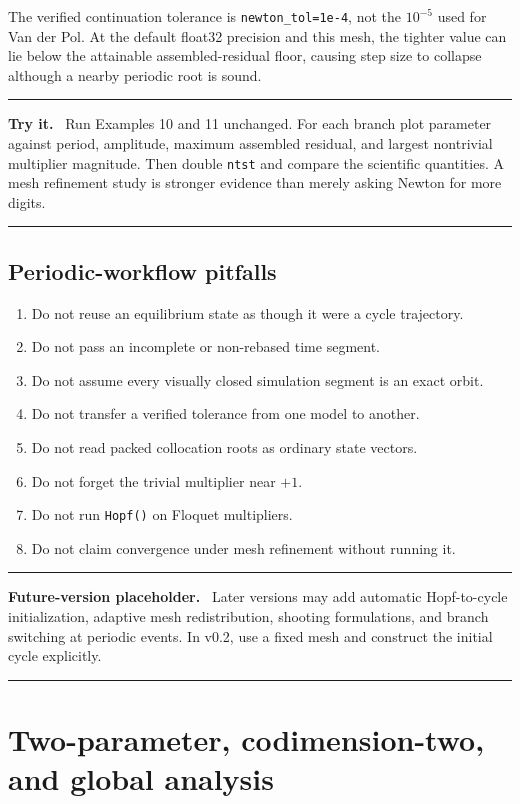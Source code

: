 \documentclass[11pt,oneside]{book}
\newenvironment{trythis}
  {\par\medskip\noindent\begin{minipage}{\textwidth}
   \color{JaxTeal}\rule{\textwidth}{0.8pt}\par
   \textbf{Try it.}\ \color{black}}
  {\par\color{JaxTeal}\rule{\textwidth}{0.8pt}
   \end{minipage}\par\medskip}
\newenvironment{futurebox}
  {\par\medskip\noindent\begin{minipage}{\textwidth}
   \color{black!55}\rule{\textwidth}{0.8pt}\par
   \textbf{Future-version placeholder.}\ \color{black}}
  {\par\color{black!55}\rule{\textwidth}{0.8pt}
   \end{minipage}\par\medskip}
\begin{document}
The verified continuation tolerance is \texttt{newton\_tol=1e-4}, not the
$10^{-5}$ used for Van der Pol. At the default float32 precision and this mesh,
the tighter value can lie below the attainable assembled-residual floor,
causing step size to collapse although a nearby periodic root is sound.

\begin{trythis}
Run Examples 10 and 11 unchanged. For each branch plot parameter against
period, amplitude, maximum assembled residual, and largest nontrivial
multiplier magnitude. Then double \texttt{ntst} and compare the scientific
quantities. A mesh refinement study is stronger evidence than merely asking
Newton for more digits.
\end{trythis}

\section{Periodic-workflow pitfalls}

\begin{enumerate}
  \item Do not reuse an equilibrium state as though it were a cycle trajectory.
  \item Do not pass an incomplete or non-rebased time segment.
  \item Do not assume every visually closed simulation segment is an exact orbit.
  \item Do not transfer a verified tolerance from one model to another.
  \item Do not read packed collocation roots as ordinary state vectors.
  \item Do not forget the trivial multiplier near $+1$.
  \item Do not run \texttt{Hopf()} on Floquet multipliers.
  \item Do not claim convergence under mesh refinement without running it.
\end{enumerate}

\begin{futurebox}
Later versions may add automatic Hopf-to-cycle initialization, adaptive mesh
redistribution, shooting formulations, and branch switching at periodic
events. In v0.2, use a fixed mesh and construct the initial cycle explicitly.
\end{futurebox}

\chapter{Two-parameter, codimension-two, and global analysis}
\end{document}
